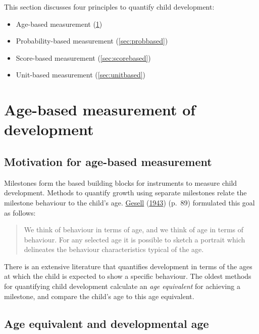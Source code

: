 \documentclass[
]{book}
\providecommand{\tightlist}{%
  \setlength{\itemsep}{0pt}\setlength{\parskip}{0pt}}
\begin{document}
This section discusses four principles to quantify child development:

\begin{itemize}
\tightlist
\item
  Age-based measurement (\ref{sec:agebased})
\item
  Probability-based measurement (\ref{sec:probbased})
\item
  Score-based measurement (\ref{sec:scorebased})
\item
  Unit-based measurement (\ref{sec:unitbased})
\end{itemize}

\hypertarget{sec:agebased}{%
\section{Age-based measurement of development}\label{sec:agebased}}

\hypertarget{motivation-for-age-based-measurement}{%
\subsection{Motivation for age-based measurement}\label{motivation-for-age-based-measurement}}

Milestones form the based building blocks for instruments to measure child development. Methods to quantify growth using separate milestones relate the milestone behaviour to the child's age. \protect\hyperlink{ref-gesell1943}{Gesell} (\protect\hyperlink{ref-gesell1943}{1943}) (p.~89) formulated this goal as follows:

\begin{quote}
We think of behaviour in terms of age, and we think of age in terms of behaviour. For any selected age it is possible to sketch a portrait which delineates the behaviour characteristics typical of the age.
\end{quote}

There is an extensive literature that quantifies development in terms of the ages at which the child is expected to show a specific behaviour. The oldest methods for quantifying child development calculate an \emph{age equivalent} for achieving a milestone, and compare the child's age to this age equivalent.

\hypertarget{sec:ageequivalent}{%
\subsection{Age equivalent and developmental age}\label{sec:ageequivalent}}
\end{document}
